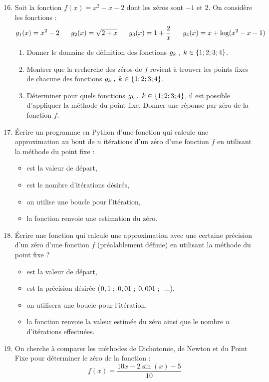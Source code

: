 \documentclass[11pt,a4paper,twoside,greek]{report}
\begin{document}
\bigskip
\begin{boxexstheorieligne}
\begin{enumerate}[label=\textbf{E\thechapter.\arabic*},itemsep=2mm]\setcounter{enumi}{15}
\item Soit la fonction $f(x)=x^2-x-2$ dont les zéros sont $-1$ et $2$. On considère les fonctions :
$$g_1(x)=x^2-2\eh{6} g_2(x)=\sqrt{2+x}\eh{6}g_3(x)=1+\frac{2}{x} \eh{6}g_4(x)=x+\log(x^2-x-1)$$
\begin{enumerate}[label=\roman*)]
\item Donner le domaine de définition des fonctions $g_k\eh{1}, \eh{1}k\in\{1;2;3;4\}$.
\item Montrer que la recherche des zéros de $f$ revient à trouver les points fixes de chacune des fonctions $g_k\eh{1}, \eh{1}k\in\{1;2;3;4\}$.
\item Déterminer pour quels fonctions $g_k\eh{1}, \eh{1}k\in\{1;2;3;4\}$, il est possible d'appliquer la méthode du point fixe. Donner une réponse par zéro de la fonction $f$.
\end{enumerate}
\item Écrire un programme en Python d'une fonction  qui calcule une approximation au bout de $n$ itérations d'un zéro d'une fonction $f$ en utilisant la méthode du point fixe : 
\vspace{-5mm}
\begin{itemize}\setlength{\itemsep}{0mm}
\item {} est la valeur de départ,
\item {} est le nombre d'itérations désirés,
\item on utilise une boucle  pour l'itération,
\item la fonction renvoie une estimation du zéro.
\end{itemize}
\item Écrire une fonction  qui calcule une approximation avec une certaine précision d'un zéro d'une fonction $f$ (préalablement définie) en utilisant la méthode du  point fixe  ?
\begin{itemize}
\item {} est la valeur de départ,
\item {} est la précision désirée ($0,1 \pvirg{1} 0,01 \pvirg{1} 0,001 \pvirg{1}$ ...),
\item on utilisera une boucle  pour l'itération,
\item la fonction renvoie la valeur estimée du zéro ainsi que le nombre $n$ d'itérations effectuées.
\end{itemize}
\item On cherche à comparer les méthodes de Dichotomie, de Newton et du Point Fixe pour déterminer le zéro de la fonction :
$$f(x)=\frac{10x-2\sin(x)-5}{10}$$


\end{enumerate}
\end{boxexstheorieligne}
\end{document}
